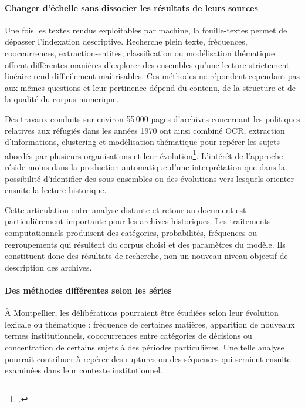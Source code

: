 \paragraph{Changer d'échelle sans dissocier les résultats de leurs sources}

Une fois les textes rendus exploitables par machine, la \gls{fouille-textes} permet de dépasser l'indexation descriptive. Recherche plein texte, fréquences, cooccurrences, \gls{extraction-entites}, classification ou modélisation thématique offrent différentes manières d'explorer des ensembles qu'une lecture strictement linéaire rend difficilement maîtrisables. Ces méthodes ne répondent cependant pas aux mêmes questions et leur pertinence dépend du contenu, de la structure et de la qualité du \gls{corpus-numerique}.

Des travaux conduits sur environ 55\,000 pages d'archives concernant les politiques relatives aux réfugiés dans les années 1970 ont ainsi combiné OCR, extraction d'informations, clustering et modélisation thématique pour repérer les sujets abordés par plusieurs organisations et leur évolution\footcite{GrantSebastian2021TopicModelling}. L'intérêt de l'approche réside moins dans la production automatique d'une interprétation que dans la possibilité d'identifier des sous-ensembles ou des évolutions vers lesquels orienter ensuite la lecture historique.

Cette articulation entre analyse distante et retour au document est particulièrement importante pour les archives historiques. Les traitements computationnels produisent des catégories, probabilités, fréquences ou regroupements qui résultent du corpus choisi et des paramètres du modèle. Ils constituent donc des résultats de recherche, non un nouveau niveau objectif de description des archives.

\paragraph{Des méthodes différentes selon les séries}

À Montpellier, les délibérations pourraient être étudiées selon leur évolution lexicale ou thématique : fréquence de certaines matières, apparition de nouveaux termes institutionnels, cooccurrences entre catégories de décisions ou concentration de certains sujets à des périodes particulières. Une telle analyse pourrait contribuer à repérer des ruptures ou des séquences qui seraient ensuite examinées dans leur contexte institutionnel.

